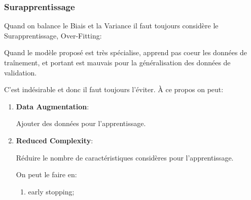 \documentclass{article}
\begin{document}
\subsubsection{Surapprentissage}
Quand on balance le Biais et la Variance il faut toujours considère le Surapprentissage, Over-Fitting:
\begin{definition}
    Quand le modèle proposé est très spécialise, apprend pas coeur les données de traînement, et portant est mauvais pour la généralisation des données de validation.
\end{definition}
C'est indésirable et donc il faut toujours l'éviter. À ce propos on peut:
\begin{enumerate}[noitemsep, rightmargin = \leftmargin]
    \item \textbf{Data Augmentation}:
    \begin{definition}
        Ajouter des données pour l'apprentissage.
    \end{definition}
    \item \textbf{Reduced Complexity}:
    \begin{definition}
        Réduire le nombre de caractéristiques considères pour l'apprentissage.
    \end{definition}
    On peut le faire en:
    \begin{enumerate}[noitemsep]
        \item early stopping;
    \end{enumerate}
\end{enumerate}
\end{document}
